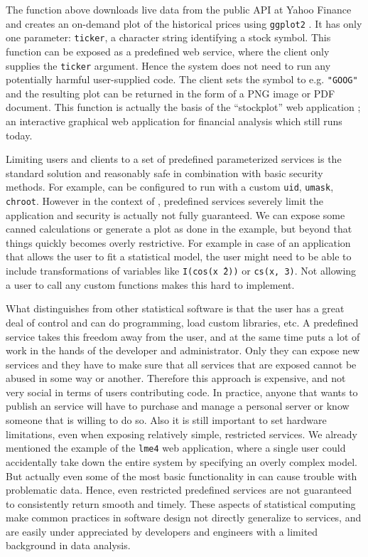 The function above downloads live data from the public API at Yahoo Finance and
creates an on-demand plot of the historical prices using \texttt{ggplot2}
\citep{ggplot2}. It has only one parameter: \texttt{ticker},
a character string identifying a stock symbol. This function can be exposed as a
predefined web service, where the client only supplies the \texttt{ticker}
argument. Hence the system does not need to run any potentially harmful
user-supplied \R code. The client sets the symbol to e.g.
\texttt{"GOOG"} and the resulting plot can be returned in the form of a
PNG image or PDF document. This function is actually the basis of the
``stockplot'' web application \citep{stockplot}; an interactive graphical web
application for financial analysis which still runs today.

Limiting users and clients to a set of predefined parameterized services is the
standard solution and reasonably safe in combination with basic security
methods. For example,  can be configured to run with a custom
\texttt{uid}, \texttt{umask}, \texttt{chroot}. However in the context of \R,
predefined services severely limit the application and security is actually not
fully guaranteed. We can expose some canned calculations or generate a plot as
done in the example, but beyond that things quickly becomes overly restrictive.
For example in case of an application that allows the user to fit a statistical
model, the user might need to be able to include transformations of variables
like \texttt{I(cos(x\^\ 2))} or \texttt{cs(x, 3)}. Not allowing a user to call
any custom functions makes this hard to implement.

What distinguishes \R from other statistical software is that the user has a
great deal of control and can do programming, load custom libraries, etc. A
predefined service takes this freedom away from the user, and at the same time
puts a lot of work in the hands of the developer and administrator. Only they
can expose new services and they have to make sure that all services that are
exposed cannot be abused in some way or another. Therefore this approach is
expensive, and not very social in terms of users contributing code. In
practice, anyone that wants to publish an \R service will have to purchase and
manage a personal server or know someone that is willing to do so. Also it is
still important to set hardware limitations, even when exposing relatively
simple, restricted services. We already mentioned the example of the
\texttt{lme4} web application, where a single user could accidentally take down
the entire system by specifying an overly complex model. But actually even some
of the most basic functionality in \R can cause trouble with problematic data.
Hence, even restricted predefined \R services are not guaranteed to
consistently return smooth and timely. These aspects of statistical computing
make common practices in software design not directly generalize to \R
services, and are easily under appreciated by developers and engineers with a
limited background in data analysis.

